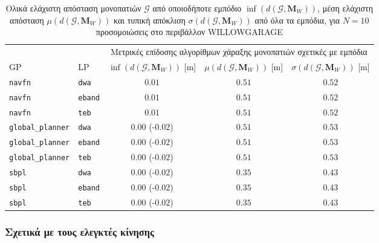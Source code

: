 \begin{table}[h]
\renewcommand{\arraystretch}{1.3}
\begin{tabular}{llccc}
  & & \multicolumn{3}{c}{Μετρικές επίδοσης αλγορίθμων χάραξης μονοπατιών σχετικές με εμπόδια} \\
  \cline{3-5}
  GP & LP & $\inf(d(\bm{\mathcal{G}},\bm{M}_W))$ [m] & $\mu(d(\bm{\mathcal{G}},\bm{M}_W))$ [m] & $\sigma(d(\bm{\mathcal{G}},\bm{M}_W))$ [m] \\ \toprule
  \texttt{navfn} & \texttt{dwa} & $0.01$ & $0.51$ & $0.52$ \\
  \texttt{navfn} & \texttt{eband} & $0.01$ & $0.51$ & $0.52$ \\
  \texttt{navfn} & \texttt{teb} & $0.01$ & $0.51$ & $0.52$ \\
  \texttt{global\_planner} & \texttt{dwa} & \hspace{1.1cm} $0.00$ (-$0.02$) & $0.51$ & $0.53$ \\
  \texttt{global\_planner} & \texttt{eband} & \hspace{1.1cm} $0.00$ (-$0.02$) & $0.51$ & $0.53$ \\
  \texttt{global\_planner} & \texttt{teb} & \hspace{1.1cm} $0.00$ (-$0.02$) & $0.51$ & $0.53$ \\
  \texttt{sbpl} & \texttt{dwa} & \hspace{1.1cm} $0.00$ (-$0.02$) & $0.35$ & $0.43$ \\
  \texttt{sbpl} & \texttt{eband} & \hspace{1.1cm} $0.00$ (-$0.02$) & $0.35$ & $0.43$ \\
  \texttt{sbpl} & \texttt{teb} & \hspace{1.1cm} $0.00$ (-$0.02$) & $0.35$ & $0.43$ \\ \bottomrule
\end{tabular}
\caption{\small Ολικά ελάχιστη απόσταση μονοπατιών $\bm{\mathcal{G}}$ από
         οποιοδήποτε εμπόδιο $\inf(d(\bm{\mathcal{G}},\bm{M}_W))$, μέση
         ελάχιστη απόσταση $\mu(d(\bm{\mathcal{G}},\bm{M}_W))$ και τυπική
         απόκλιση $\sigma(d(\bm{\mathcal{G}},\bm{M}_W))$ από όλα τα εμπόδια,
         για $N=10$ προσομοιώσεις στο περιβάλλον WILLOWGARAGE}
\label{tbl:info_global_plan_map_willowgarage}
\end{table}


\subsubsection{Σχετικά με τους ελεγκτές κίνησης}

